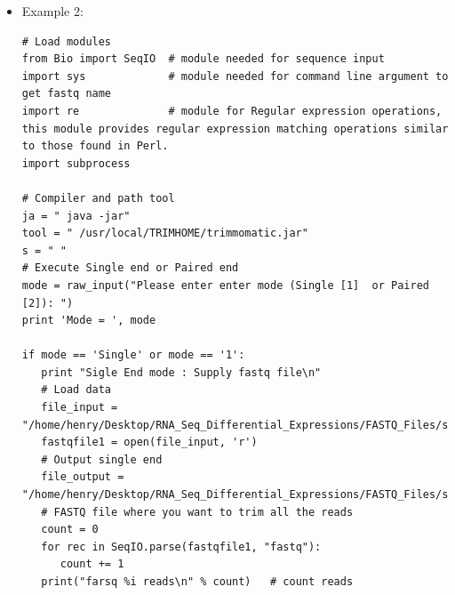 \documentclass{article}
\begin{document}
\begin{itemize}
\begin{verbatim}
   # Load data reverse
   filename_reverse = "/home/henry/Desktop/RNA_Seq_Differential_Expressions/FASTQ_Files/paired_end/ERR950159_2.fastq"
   fastq_reverse = open(filename_reverse, 'r') 
   # FASTQ file where you want to trim all the reads
   #count = 0
   #for rec in SeqIO.parse(fastq_reverse, "fastq"):
   #   count += 1
   #print("fastq reverse %i reads" % count)   # count reads

   # Outputs paired end
   output_forward_paired = "/home/henry/Desktop/RNA_Seq_Differential_Expressions/FASTQ_Files/paired_end/output_forward_paired_ERR950159_1.fastq" 
   output_forward_unpaired = "/home/henry/Desktop/RNA_Seq_Differential_Expressions/FASTQ_Files/paired_end/output_forward_unpaired_ERR950159_1.fastq" 
   output_reverse_paired = "/home/henry/Desktop/RNA_Seq_Differential_Expressions/FASTQ_Files/paired_end/output_reverse_paired_ERR950159_2.fastq"  
   output_reverse_unpaired = "/home/henry/Desktop/RNA_Seq_Differential_Expressions/FASTQ_Files/paired_end/output_reverse_unpaired_ERR950159_2.fastq" 

   print "Start Trimmonatics :"    
   print "--------------------" 
   attribute              = "PE -threads 12 -phred33 "
   illuminaclip_adapters  = "ILLUMINACLIP:/usr/local/TRIMHOME/adapters/TruSeq3-PE.fa:2:30:10"
   illuminaclip_Attribute = "LEADING:3 TRAILING:3 SLIDINGWINDOW:4:15 MINLEN:36"
   cmd1 = s + ja + s + tool + s + attribute + s + filename_forward + s + filename_reverse + s + output_forward_paired + s + output_forward_unpaired
   cmd2 = s + output_reverse_paired + s + output_reverse_unpaired + s + illuminaclip_adapters + s + illuminaclip_Attribute
   cmd  =  cmd1 + cmd2
   os.system(cmd)
\end{verbatim}
\normalsize
\item Example 2:
\tiny  
\begin{verbatim}
# Load modules
from Bio import SeqIO  # module needed for sequence input  
import sys             # module needed for command line argument to get fastq name  
import re              # module for Regular expression operations, this module provides regular expression matching operations similar to those found in Perl.
import subprocess

# Compiler and path tool
ja = " java -jar"
tool = " /usr/local/TRIMHOME/trimmomatic.jar"
s = " "
# Execute Single end or Paired end
mode = raw_input("Please enter enter mode (Single [1]  or Paired [2]): ")
print 'Mode = ', mode

if mode == 'Single' or mode == '1':  
   print "Sigle End mode : Supply fastq file\n"
   # Load data 
   file_input = "/home/henry/Desktop/RNA_Seq_Differential_Expressions/FASTQ_Files/single_end/ERR458493.fastq"
   fastqfile1 = open(file_input, 'r') 
   # Output single end
   file_output = "/home/henry/Desktop/RNA_Seq_Differential_Expressions/FASTQ_Files/single_end/output_single_ERR458493.fastq"
   # FASTQ file where you want to trim all the reads
   count = 0
   for rec in SeqIO.parse(fastqfile1, "fastq"):
      count += 1
   print("farsq %i reads\n" % count)   # count reads


\end{verbatim}
\end{itemize}
\end{document}
